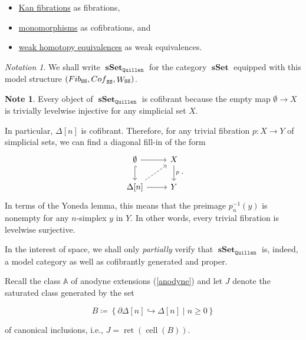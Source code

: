 \documentclass[10pt,letterpaper,cm]{nupset}
\theoremstyle{definition}
\newtheorem{note}[definition]{Note}
\theoremstyle{theorem}
\theoremstyle{remark}
\newtheorem*{notation}{Notation}
\newcommand{\0}{\mathbf{0}}
\newcommand{\1}{\mathbf{1}}
\newcommand{\2}{\mathbf{2}}
\DeclareMathOperator{\sset}{\mathbf{sSet}}
\DeclareMathOperator{\fib}{\mathnormal{Fib}}
\DeclareMathOperator{\cof}{\mathnormal{Cof}}
\DeclareMathOperator{\we}{\mathnormal{W}}
\DeclareMathOperator{\cell}{cell}
\DeclareMathOperator{\ret}{ret}
\newcommand{\bi}{\begin{itemize}}
\newcommand{\ei}{\end{itemize}}
\begin{document}
\bi
\item \underline{Kan fibrations} as fibrations,
\item \underline{monomorphisms} as cofibrations, and
\item \underline{weak homotopy equivalences} as weak equivalences.
\ei

\begin{notation}
We shall write $\sset_{\mathtt{Quillen}}$ for the category $\sset$ equipped with this model structure $\left(\fib_{\mathtt{SS}}, \cof_{\mathtt{SS}}, \we_{\mathtt{SS}}\right)$. 
\end{notation}

\smallskip


\begin{note}\label{trivsurj}
Every object of $\sset_{\mathtt{Quillen}}$ is cofibrant because the empty map $\emptyset \to X$ is trivially levelwise injective for any simplicial set $X$.

\smallskip

In particular, $\Delta[n]$ is cofibrant. Therefore, for any trivial fibration $p : X \to Y$ of simplicial sets, we can find a diagonal fill-in of the form
\[
\begin{tikzcd}
\emptyset \arrow[r] \arrow[d, hook]                 & X \arrow[d, "p"] \\
{\Delta[n]} \arrow[r] \arrow[ru, dashed] & Y               
\end{tikzcd}
.\] In terms of the Yoneda lemma, this means that the preimage $p_n^{-1}(y)$ is nonempty for any $n$-simplex $y$ in $Y$. In other words, every trivial fibration is levelwise surjective.
\end{note}

\smallskip 

In the interest of space, we shall only \emph{partially} verify that $\sset_{\mathtt{Quillen}}$ is, indeed, a model category as well as cofibrantly generated and proper.


\medskip

Recall the class $\mathbb{A}$ of anodyne extensions (\cref{anodyne}) and let $J$ denote the saturated class generated by the set 

\[ \label{classB}
B\coloneqq \left\{\partial{\Delta[n]} \hookrightarrow \Delta[n] \mid n\geq 0\right\}
\] 

of canonical inclusions, i.e., $J = \ret(\cell(B))$.
\end{document}
